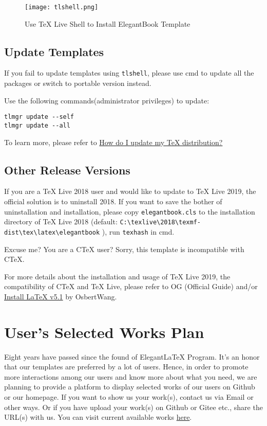 \documentclass[11pt]{elegantbook}
\begin{document}
\begin{figure}[htbp]
  \centering
  \texttt{[image: tlshell.png]}
  \caption{Use \TeX{} Live Shell to Install ElegantBook Template}
\end{figure}

\subsection{Update Templates}
If you fail to update templates using \lstinline{tlshell}, please use cmd to update all the packages or switch to portable version instead.

Use the following commands(administrator privileges) to update:
\begin{lstlisting}
tlmgr update --self 
tlmgr update --all
\end{lstlisting}

To learn more, please refer to \href{https://tex.stackexchange.com/questions/55437/how-do-i-update-my-tex-distribution}{How do I update my \TeX{} distribution?}

\subsection{Other Release Versions}
If you are a \TeX{} Live 2018 user and would like to update to \TeX{} Live 2019, the official solution is to uninstall 2018. If you want to save the bother of uninstallation and installation, please copy \lstinline{elegantbook.cls} to the installation directory of \TeX{} Live 2018 (default: \lstinline|C:\texlive\2018\texmf-dist\tex\latex\elegantbook| ), run \lstinline{texhash} in cmd.

Excuse me? You are a  C\TeX{}  user? Sorry, this template is incompatible with C\TeX{}.

For more details about the installation and usage of \TeX{} Live 2019, the compatibility of C\TeX{} and \TeX{} Live, please refer to OG (Official Guide) and/or \href{https://github.com/OsbertWang/install_latex/releases}{Install LaTeX v5.1} by OsbertWang.

\section{User\rq s Selected Works Plan}
Eight years have passed since the found of Elegant\LaTeX{} Program. It\rq s an honor that our templates are preferred by a lot of users. Hence, in order to promote more interactions among our users and know more about what you need, we are planning to provide a platform to display selected works of our users on Github or our homepage. If you want to show us your work(s), contact us via Email or other ways. Or if you have upload your work(s) on Github or Gitee etc., share the URL(s) with us. You can visit current available works \href{https://github.com/ElegantLaTeX/Archive/tree/master/Collections}{here}.
\end{document}
